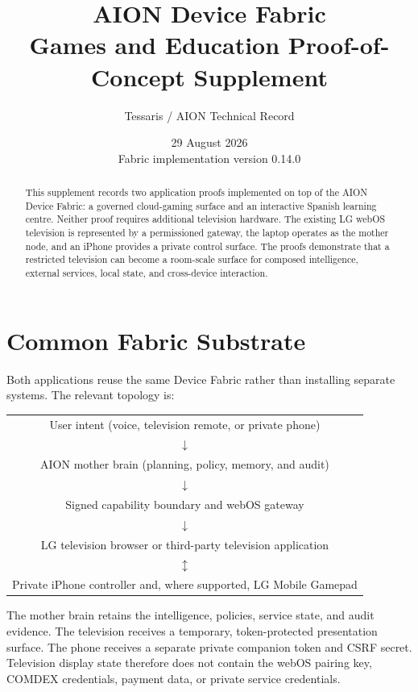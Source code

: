 \documentclass[11pt,a4paper]{article}
\title{\textbf{AION Device Fabric}\\Games and Education Proof-of-Concept Supplement}
\author{Tessaris / AION Technical Record}
\date{29 August 2026\\Fabric implementation version 0.14.0}
\begin{document}
\maketitle

\begin{abstract}
This supplement records two application proofs implemented on top of the AION
Device Fabric: a governed cloud-gaming surface and an interactive Spanish
learning centre.  Neither proof requires additional television hardware.  The
existing LG webOS television is represented by a permissioned gateway, the
laptop operates as the mother node, and an iPhone provides a private control
surface.  The proofs demonstrate that a restricted television can become a
room-scale surface for composed intelligence, external services, local state,
and cross-device interaction.
\end{abstract}

\section{Common Fabric Substrate}

Both applications reuse the same Device Fabric rather than installing separate
systems.  The relevant topology is:

\begin{center}
\begin{tabular}{c}
User intent (voice, television remote, or private phone)\\
$\downarrow$\\
AION mother brain (planning, policy, memory, and audit)\\
$\downarrow$\\
Signed capability boundary and webOS gateway\\
$\downarrow$\\
LG television browser or third-party television application\\
$\updownarrow$\\
Private iPhone controller and, where supported, LG Mobile Gamepad
\end{tabular}
\end{center}

The mother brain retains the intelligence, policies, service state, and audit
evidence.  The television receives a temporary, token-protected presentation
surface.  The phone receives a separate private companion token and CSRF
secret.  Television display state therefore does not contain the webOS pairing
key, COMDEX credentials, payment data, or private service credentials.
\end{document}
